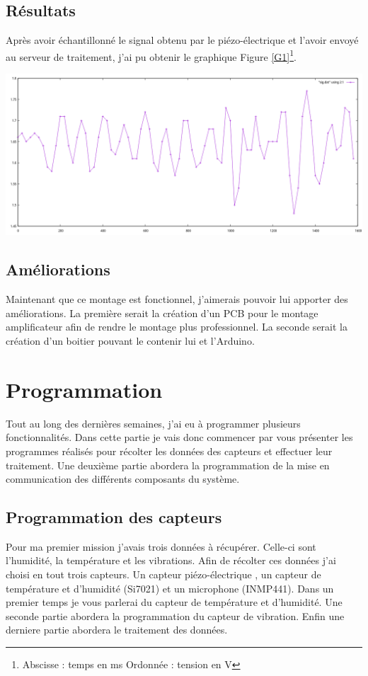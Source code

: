 \documentclass[11pt,french,a4paper]{article}
\begin{document}
\subsection{Résultats}
Après avoir échantillonné le signal obtenu par le piézo-électrique et l'avoir envoyé au serveur de traitement, j'ai pu obtenir le graphique Figure \ref{G1}\footnote{ Abscisse : temps en ms Ordonnée : tension en V }.
\begin{center}
    \includegraphics[scale=0.3]{../img/GRAPH1.png}
    \label{G1}
\end{center}
\subsection{Améliorations}
Maintenant que ce montage est fonctionnel, j'aimerais pouvoir lui apporter des améliorations. La première serait la création d'un PCB pour le montage amplificateur afin de rendre le montage plus professionnel. La seconde serait la création d'un boitier pouvant le contenir lui et l'Arduino. 
\newpage
\section{Programmation}
Tout au long des dernières semaines, j'ai eu à programmer plusieurs fonctionnalités. Dans cette partie je vais donc commencer par vous présenter les programmes réalisés pour récolter les données des capteurs et effectuer leur traitement. Une deuxième partie abordera la programmation de la mise en communication des différents composants du système.
\subsection{Programmation des capteurs}
Pour ma premier mission j'avais trois  données à récupérer. Celle-ci sont l'humidité, la température et les vibrations. Afin de récolter ces données j'ai choisi en tout trois capteurs. Un capteur piézo-électrique , un capteur de température et d'humidité (Si7021) et un microphone (INMP441). Dans un premier temps je vous parlerai du capteur de température et d'humidité. Une seconde partie abordera la programmation du capteur de vibration. Enfin une derniere partie abordera le traitement des données.  
\end{document}
